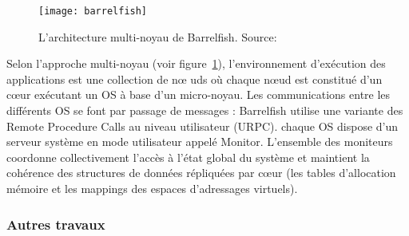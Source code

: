       \begin{figure}[h]
        \centering \texttt{[image: barrelfish]}
        \caption{L'architecture multi-noyau de Barrelfish. Source:
          \citeauthor{schupbach2008embracing}}
        \label{fig:barrelfish}
      \end{figure}
        
      Selon l’approche multi-noyau (voir figure~\ref{fig:barrelfish}),
      l'environnement d’exécution des applications est une collection de n\oe
      uds où chaque n\oe ud est constitué d’un c\oe ur exécutant un OS à base
      d’un micro-noyau. Les communications entre les différents OS se font par
      passage de messages : Barrelfish utilise une variante des Remote Procedure
      Calls au niveau utilisateur (URPC). chaque OS dispose d’un serveur système
      en mode utilisateur appelé Monitor. L’ensemble des moniteurs coordonne
      collectivement l’accès à l’état global du système et maintient la
      cohérence des structures de données répliquées par c\oe ur (les tables
      d’allocation mémoire et les mappings des espaces d’adressages
      virtuels).\newline



            
    \subsubsection{Autres travaux}
    \label{subsec:others}
    

